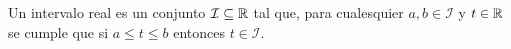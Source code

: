 

\begin{definition}
    \label{def:real_interval}
    Un intervalo real es un conjunto $\mathcal{I} \subseteq \mathbb{R}$ tal que, para cualesquier $a,b \in \mathcal{I}$ y $t \in \mathbb{R}$ se cumple que si $a \leq t \leq b$ entonces $t \in \mathcal{I}$.
\end{definition}

